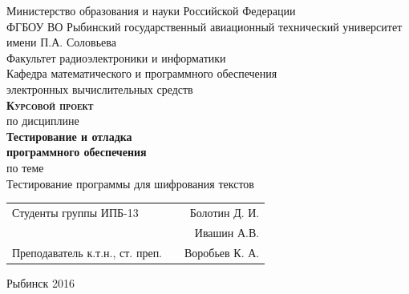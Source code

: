 \documentclass[a4paper,12pt]{article}
\begin{document}
\begin{titlepage}
\newpage


\begin{center}
	\large		
   	Министерство образования и науки Российской Федерации\\[0.5cm]
    	
	ФГБОУ ВО Рыбинский государственный авиационный технический университет имени П.А. Соловьева\\[1.0cm]

	Факультет радиоэлектроники и информатики\\[0.25cm]
		
	Кафедра математического и программного обеспечения\\ электронных вычислительных средств\\[1.5cm]
	
	\Large
	\textbf{\textsc{Курсовой проект}}\\[0.25cm]
	по  дисциплине\\
	\textbf{Тестирование и отладка\\ программного обеспечения}\\[0.5cm]
	
	по теме\\
	Тестирование программы для шифрования текстов
	
\end{center}

\vfill	
\begin{tabularx}{0.95\textwidth}{lXr}
Студенты группы ИПБ-13 			& &	Болотин Д. И.\\
								& &	Ивашин А.В. \\
Преподаватель к.т.н., ст. преп.	& & Воробьев К. А.\\
\end{tabularx}

\vspace{1.5cm}
\center Рыбинск 2016
\end{titlepage}	


\newpage
\setcounter{page}{2}

\tableofcontents
\end{document}
